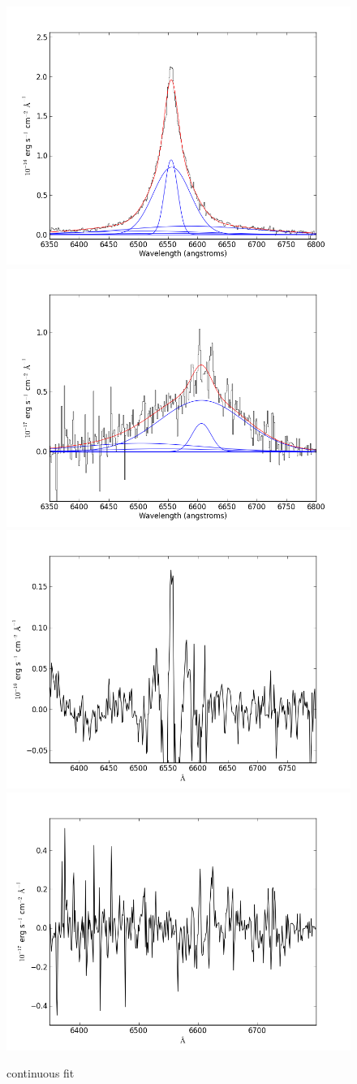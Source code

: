 \documentclass[usenatbib]{mn2e}
\begin{document}
\newpage


\begin{figure}
\begin{center}
\includegraphics[width=0.46\linewidth,angle=0]{Halpha_10.png}
\vspace{5mm}
\includegraphics[width=0.49\linewidth,angle=0]{Halpha_11.png}\\
\includegraphics[width=0.46\linewidth,angle=0]{Halpha_res_10.png}
\hspace{5mm}
\includegraphics[width=0.49\linewidth,angle=0]{Halpha_res_11.png}\\
\end{center} 
\caption{continuous fit \label{fig:landscape}}   
\end{figure}
\end{document}
